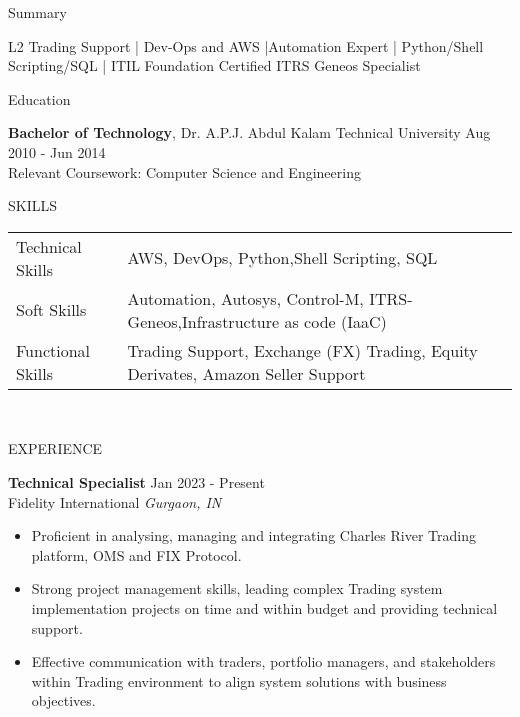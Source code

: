 \documentclass{resume} %
\begin{document}
\begin{sloppypar}


    \begin{rSection}{Summary}

    {L2 Trading Support | Dev-Ops and AWS |Automation Expert | Python/Shell Scripting/SQL | ITIL Foundation Certified ITRS Geneos Specialist}


    \end{rSection}

    \begin{rSection}{Education}

    {\bf Bachelor of Technology}, Dr. A.P.J. Abdul Kalam Technical University \hfill {Aug 2010 - Jun 2014}\\
    Relevant Coursework: Computer Science and Engineering
    \end{rSection}

\begin{rSection}{SKILLS}
    \begin{tabular}{ l | l }
    Technical Skills &  AWS, DevOps, Python,Shell Scripting, SQL \\
    Soft Skills & Automation, Autosys, Control-M, ITRS-Geneos,Infrastructure as code (IaaC)\\
    Functional Skills & Trading Support, Exchange (FX) Trading, Equity Derivates, Amazon Seller Support\\
    \end{tabular}\\
    \end{rSection}

    \begin{rSection}{EXPERIENCE}

        \textbf{Technical Specialist} \hfill Jan 2023 - Present\\
        Fidelity International \hfill \textit{Gurgaon, IN}
        \begin{itemize}
            \itemsep -3pt {}
            \item Proficient in analysing, managing and integrating Charles River Trading platform, OMS and FIX Protocol.
            \item Strong project management skills, leading complex Trading system implementation projects on time and within budget and providing technical support.
            \item Effective communication with traders, portfolio managers, and stakeholders within Trading environment to align system solutions with business objectives.
        \end{itemize}


\end{rSection}
\end{sloppypar}
\end{document}
